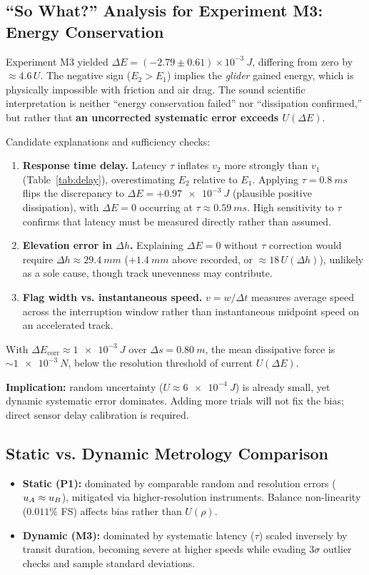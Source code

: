 \documentclass[a4paper, 12pt]{article}
\begin{document}
        \subsection{``So What?'' Analysis for Experiment M3: Energy Conservation}
        Experiment M3 yielded $\Delta E=(-2.79\pm0.61)\times10^{-3}\ \si{J}$, differing from zero by $\approx 4.6\,U$. The negative sign ($E_2>E_1$) implies the \textit{glider} gained energy, which is physically impossible with friction and air drag. The sound scientific interpretation is neither ``energy conservation failed'' nor ``dissipation confirmed,'' but rather that \textbf{an uncorrected systematic error exceeds $U(\Delta E)$}.

        Candidate explanations and sufficiency checks:
        \begin{enumerate}
            \item \textbf{Response time delay.} Latency $\tau$ inflates $v_2$ more strongly than $v_1$ (Table~\ref{tab:delay}), overestimating $E_2$ relative to $E_1$. Applying $\tau=\SI{0.8}{ms}$ flips the discrepancy to $\Delta E=+\SI{0.97e-3}{J}$ (plausible positive dissipation), with $\Delta E=0$ occurring at $\tau\approx\SI{0.59}{ms}$. High sensitivity to $\tau$ confirms that latency must be measured directly rather than assumed.
            \item \textbf{Elevation error in $\Delta h$.} Explaining $\Delta E=0$ without $\tau$ correction would require $\Delta h\approx\SI{29.4}{mm}$ ($+\SI{1.4}{mm}$ above recorded, or $\approx 18\,U(\Delta h)$), unlikely as a sole cause, though track unevenness may contribute.
            \item \textbf{Flag width vs. instantaneous speed.} $v=w/\Delta t$ measures average speed across the interruption window rather than instantaneous midpoint speed on an accelerated track.
        \end{enumerate}
        With $\Delta E_{\text{corr}}\approx\SI{1e-3}{J}$ over $\Delta s=\SI{0.80}{m}$, the mean dissipative force is $\sim\SI{1e-3}{N}$, below the resolution threshold of current $U(\Delta E)$.

        \textbf{Implication:} random uncertainty ($U\approx\SI{6e-4}{J}$) is already small, yet dynamic systematic error dominates. Adding more trials will not fix the bias; direct sensor delay calibration is required.

        \subsection{Static vs. Dynamic Metrology Comparison}
        \begin{itemize}
            \item \textbf{Static (P1):} dominated by comparable random and resolution errors ($u_{A} \approx u_{B}$), mitigated via higher-resolution instruments. Balance non-linearity ($0.011\%$ FS) affects bias rather than $U(\rho)$.
            \item \textbf{Dynamic (M3):} dominated by systematic latency ($\tau$) scaled inversely by transit duration, becoming severe at higher speeds while evading $3\sigma$ outlier checks and sample standard deviations.
        \end{itemize}
\end{document}
